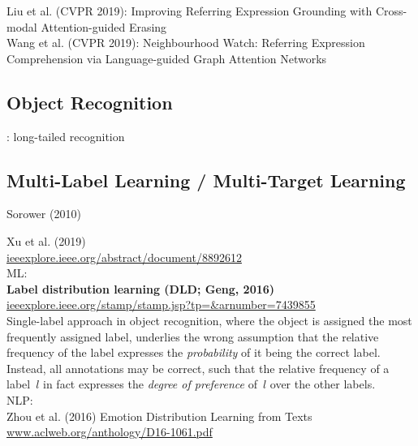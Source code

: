 \documentclass[11pt,a4paper]{article}
\begin{document}
\noindent
Liu et al. (CVPR 2019): Improving Referring Expression Grounding
with Cross-modal Attention-guided Erasing\\

\noindent
Wang et al. (CVPR 2019): Neighbourhood Watch: Referring Expression Comprehension via
Language-guided Graph Attention Networks\\

\subsection{Object Recognition}
: long-tailed recognition

\subsection{Multi-Label Learning / Multi-Target Learning}
Sorower (2010)

\noindent
Xu et al. (2019)\\
\url{ieeexplore.ieee.org/abstract/document/8892612}\\

\noindent
ML:\\
\textbf{Label distribution learning (DLD; Geng, 2016)}\\ \url{ieeexplore.ieee.org/stamp/stamp.jsp?tp=&arnumber=7439855}\\
Single-label approach in object recognition, where the object is assigned the most frequently assigned label, underlies the wrong assumption that the relative frequency of the label expresses the \textit{probability} of it being the correct label. Instead, all annotations may be correct, such that the relative frequency of a label~$l$ in fact expresses the \textit{degree of preference} of~$l$ over the other labels.   \\ 

\noindent
NLP:\\
Zhou et al. (2016) Emotion Distribution Learning from Texts\\
\url{www.aclweb.org/anthology/D16-1061.pdf}\\
\end{document}

